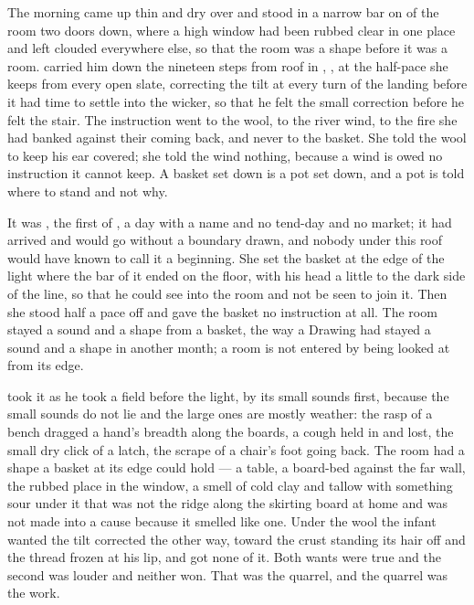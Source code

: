 The morning came up thin and dry over  and stood in a narrow bar on  of the room two doors down, where a high window had been rubbed clear in one place and left clouded everywhere else, so that the room was a shape before it was a room.  carried him down the nineteen steps from  roof in , ,  at the half-pace she keeps from every open slate, correcting the tilt at every turn of the landing before it had time to settle into the wicker, so that he felt the small correction before he felt the stair. The instruction went to the wool, to the river wind, to the fire she had banked against their coming back, and never to the basket. She told the wool to keep his ear covered; she told the wind nothing, because a wind is owed no instruction it cannot keep. A basket set down is a pot set down, and a pot is told where to stand and not why.

It was , the first of , a day with a name and no tend-day and no market; it had arrived and would go without a boundary drawn, and nobody under this roof would have known to call it a beginning. She set the basket at the edge of the light where the bar of it ended on the floor, with his head a little to the dark side of the line, so that he could see into the room and not be seen to join it. Then she stood half a pace off and gave the basket no instruction at all. The room stayed a sound and a shape from a basket, the way a Drawing had stayed a sound and a shape in another month; a room is not entered by being looked at from its edge.

 took it as he took a field before the light, by its small sounds first, because the small sounds do not lie and the large ones are mostly weather: the rasp of a bench dragged a hand's breadth along the boards, a cough held in and lost, the small dry click of a latch, the scrape of a chair's foot going back. The room had a shape a basket at its edge could hold --- a table, a board-bed against the far wall, the rubbed place in the window, a smell of cold clay and tallow with something sour under it that was not the ridge along the skirting board at home and was not made into a cause because it smelled like one. Under the wool the infant wanted the tilt corrected the other way, toward the crust standing its hair off and the thread frozen at his lip, and got none of it. Both wants were true and the second was louder and neither won. That was the quarrel, and the quarrel was the work.

